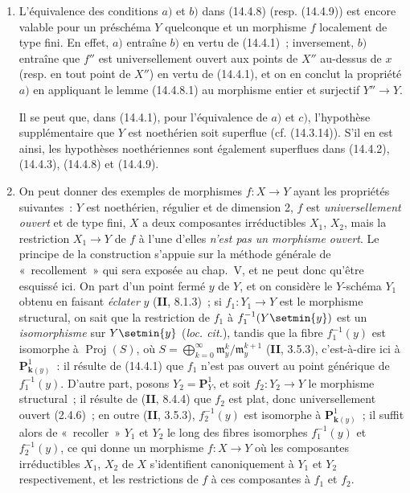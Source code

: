 \begin{remarks}[14.4.10]
\label{IV.14.4.10-fr}
\begin{enumerate}[label=(\roman*)]
  \item L'équivalence des conditions $a)$ et $b)$ dans (14.4.8) (resp. (14.4.9))
  est encore valable pour un préschéma $Y$ quelconque et un morphisme $f$
  localement de type fini. En effet, $a)$ entraîne $b)$ en vertu de (14.4.1)~;
  inversement, $b)$ entraîne que $f''$ est universellement ouvert aux points de
  $X''$ au-dessus de $x$ (resp. en tout point de $X''$) en vertu de (14.4.1), et
  on en conclut la propriété $a)$ en appliquant le lemme (14.4.8.1) au morphisme
  entier et surjectif $Y''\to Y$.

  Il se peut que, dans (14.4.1), pour l'équivalence de $a)$ et $c)$, l'hypothèse
  supplémentaire que $Y$ est noethérien soit superflue (cf. (14.3.14)). S'il en
  est ainsi, les hypothèses noethériennes sont également superflues dans (14.4.2),
  (14.4.3), (14.4.8) et (14.4.9).

  \item On peut donner des exemples de morphismes $f:X\to Y$ ayant les propriétés
  suivantes~: $Y$ est noethérien, régulier et de dimension 2, $f$ est
  \emph{universellement ouvert} et de type fini, $X$ a deux composantes
  irréductibles $X_1$, $X_2$, mais la restriction $X_1\to Y$ de $f$ à l'une
  d'elles \emph{n'est pas un morphisme ouvert}. Le principe de la construction
  s'appuie sur la méthode générale de «~recollement~» qui sera exposée au chap.~V,
  et ne peut donc qu'être esquissé ici. On part d'un point fermé $y$ de $Y$, et on
  considère le $Y$-schéma $Y_1$ obtenu en faisant \emph{éclater} $y$
  (\textbf{II}, 8.1.3)~; si $f_1:Y_1\to Y$ est le morphisme structural, on sait que
  la restriction de $f_1$ à $f_1^{-1}(Y\setmin\{y\})$ est un \emph{isomorphisme} sur
  $Y\setmin\{y\}$ (\emph{loc. cit.}), tandis que la fibre $f_1^{-1}(y)$ est isomorphe à
  $\operatorname{Proj}(S)$, où
  $S=\bigoplus_{k=0}^{\infty}\mathfrak m_y^k/\mathfrak m_y^{k+1}$
  (\textbf{II}, 3.5.3), c'est-à-dire ici à $\mathbf P^1_{\mathbf{k}(y)}$~: il résulte de
  (14.4.1) que $f_1$ n'est pas ouvert au point générique de $f_1^{-1}(y)$. D'autre
  part, posons $Y_2=\mathbf P^1_Y$, et soit $f_2:Y_2\to Y$ le morphisme structural~;
  il résulte de (\textbf{II}, 8.4.4) que $f_2$ est plat, donc universellement ouvert
  (2.4.6)~; en outre (\textbf{II}, 3.5.3), $f_2^{-1}(y)$ est isomorphe à
  $\mathbf P^1_{\mathbf{k}(y)}$~; il suffit alors de «~recoller~» $Y_1$ et $Y_2$ le long des
  fibres isomorphes $f_1^{-1}(y)$ et $f_2^{-1}(y)$, ce qui donne un morphisme
  $f:X\to Y$ où les composantes irréductibles $X_1$, $X_2$ de $X$ s'identifient
  canoniquement à $Y_1$ et $Y_2$ respectivement, et les restrictions de $f$ à ces
  composantes à $f_1$ et $f_2$.


\end{enumerate}
\end{remarks}
